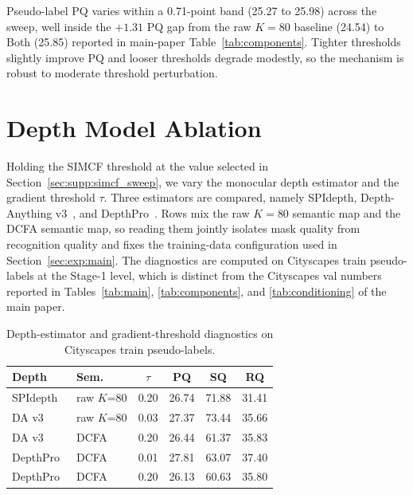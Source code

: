 \documentclass{article}
\begin{document}
Pseudo-label PQ varies within a 0.71-point band (25.27 to 25.98) across the sweep, well inside the $+1.31$ PQ gap from the raw $K{=}80$ baseline (24.54) to Both (25.85) reported in main-paper Table~\ref{tab:components}. Tighter thresholds slightly improve PQ and looser thresholds degrade modestly, so the mechanism is robust to moderate threshold perturbation.

\section{Depth Model Ablation}
\label{sec:supp:depth}

Holding the SIMCF threshold at the value selected in Section~\ref{sec:supp:simcf_sweep}, we vary the monocular depth estimator and the gradient threshold $\tau$. Three estimators are compared, namely SPIdepth, Depth-Anything v3~\cite{lin2025da3}, and DepthPro~\cite{bochkovskii2024depthpro}. Rows mix the raw $K{=}80$ semantic map and the DCFA semantic map, so reading them jointly isolates mask quality from recognition quality and fixes the training-data configuration used in Section~\ref{sec:exp:main}. The diagnostics are computed on Cityscapes train pseudo-labels at the Stage-1 level, which is distinct from the Cityscapes val numbers reported in Tables~\ref{tab:main}, \ref{tab:components}, and \ref{tab:conditioning} of the main paper.

\begin{table}[!htbp]
\caption{Depth-estimator and gradient-threshold diagnostics on Cityscapes train pseudo-labels.}
\label{tab:depth}
\centering
\small
\setlength{\tabcolsep}{6pt}
\begin{tabular}{l l c c c c}
\toprule
Depth & Sem. & $\tau$ & PQ & SQ & RQ \\
\midrule
SPIdepth & raw $K$=80 & 0.20 & 26.74 & 71.88 & 31.41 \\
DA v3~\cite{lin2025da3} & raw $K$=80 & 0.03 & 27.37 & 73.44 & 35.66 \\
DA v3~\cite{lin2025da3} & DCFA & 0.20 & 26.44 & 61.37 & 35.83 \\
DepthPro~\cite{bochkovskii2024depthpro} & DCFA & 0.01 & 27.81 & 63.07 & 37.40 \\
DepthPro~\cite{bochkovskii2024depthpro} & DCFA & 0.20 & 26.13 & 60.63 & 35.80 \\
\bottomrule
\end{tabular}
\end{table}
\end{document}
